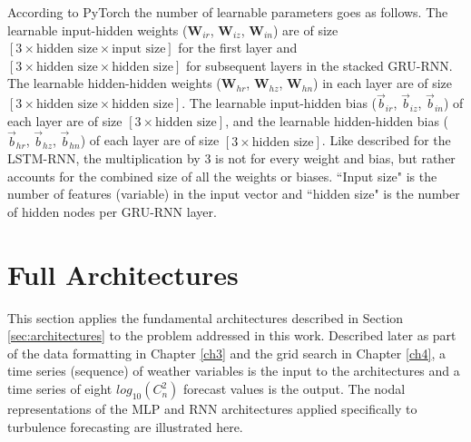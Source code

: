 According to PyTorch \cite{PyTorch} the number of learnable parameters goes as follows. The learnable input-hidden weights ($\textbf{W}_{ir}$, $\textbf{W}_{iz}$, $\textbf{W}_{in}$) are of size $\left[3 \times \text{hidden size} \times \text{input size}\right]$ for the first layer and $\left[3 \times \text{hidden size} \times \text{hidden size}\right]$ for subsequent layers in the stacked \ac{GRU-RNN}. The learnable hidden-hidden weights ($\textbf{W}_{hr}$, $\textbf{W}_{hz}$, $\textbf{W}_{hn}$) in each layer are of size $\left[3 \times \text{hidden size} \times \text{hidden size}\right]$. The learnable input-hidden bias ($\vec{b}_{ir}$, $\vec{b}_{iz}$, $\vec{b}_{in}$) of each layer are of size $\left[3 \times \text{hidden size}\right]$, and the learnable hidden-hidden bias ($\vec{b}_{hr}$, $\vec{b}_{hz}$, $\vec{b}_{hn}$) of each layer are of size $\left[3 \times \text{hidden size}\right]$. Like described for the \ac{LSTM-RNN}, the multiplication by 3 is not for every weight and bias, but rather accounts for the combined size of all the weights or biases. ``Input size" is the number of features (variable) in the input vector and ``hidden size" is the number of hidden nodes per \ac{GRU-RNN} layer.

\section{Full Architectures}
This section applies the fundamental architectures described in Section \ref{sec:architectures} to the problem addressed in this work. Described later as part of the data formatting in Chapter \ref{ch3} and the grid search in Chapter \ref{ch4}, a time series (sequence) of weather variables is the input to the architectures and a time series of eight $log_{10}(C_{n}^{2})$ forecast values is the output. The nodal representations of the \ac{MLP} and \ac{RNN} architectures applied specifically to turbulence forecasting are illustrated here.

